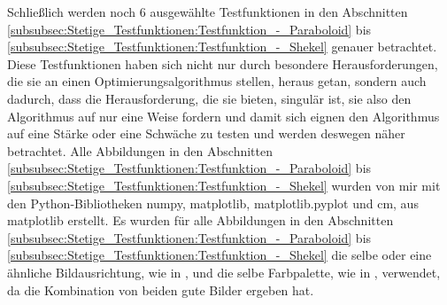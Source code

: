 \documentclass[fontsize=12, a4aper]{scrartcl}
\begin{document}
	Schließlich werden noch 6 ausgewählte Testfunktionen in den Abschnitten \ref{subsubsec:Stetige_Testfunktionen:Testfunktion_-_Paraboloid} bis \ref{subsubsec:Stetige_Testfunktionen:Testfunktion_-_Shekel} genauer betrachtet. Diese Testfunktionen haben sich nicht nur durch besondere Herausforderungen, die sie an einen Optimierungsalgorithmus stellen, heraus getan, sondern auch dadurch, dass die Herausforderung, die sie bieten, singulär ist, sie also den Algorithmus auf nur eine Weise fordern und damit sich eignen den Algorithmus auf eine Stärke oder eine Schwäche zu testen und werden deswegen näher betrachtet. Alle Abbildungen in den Abschnitten \ref{subsubsec:Stetige_Testfunktionen:Testfunktion_-_Paraboloid} bis \ref{subsubsec:Stetige_Testfunktionen:Testfunktion_-_Shekel} wurden von mir mit den Python-Bibliotheken \glqq numpy\grqq, \glqq matplotlib\grqq, \glqq matplotlib.pyplot\grqq{} und \glqq cm\grqq{}, aus \glqq matplotlib\grqq{} erstellt. Es wurden für alle Abbildungen in den Abschnitten \ref{subsubsec:Stetige_Testfunktionen:Testfunktion_-_Paraboloid} bis \ref{subsubsec:Stetige_Testfunktionen:Testfunktion_-_Shekel} die selbe oder eine ähnliche Bildausrichtung, wie in \cite{molga2005test}, und die selbe Farbpalette, wie in \cite{kim2020benchmark}, verwendet, da die Kombination von beiden gute Bilder ergeben hat.
	
\end{document}
